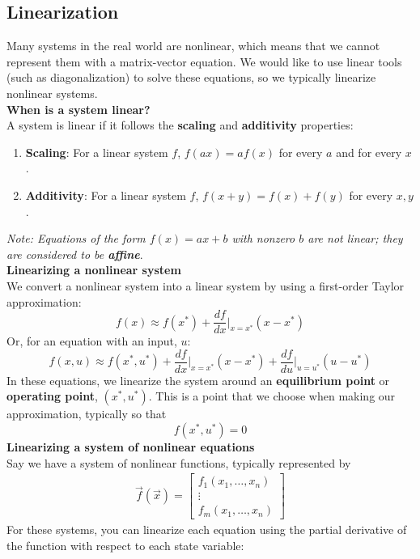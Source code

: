 \subsection*{Linearization}
Many systems in the real world are nonlinear, which means that we cannot represent them with a matrix-vector equation. 
We would like to use linear tools (such as diagonalization) to solve these equations, so we typically linearize nonlinear systems. \\
\newline
\textbf{When is a system linear?} \\
A system is linear if it follows the \textbf{scaling} and \textbf{additivity} properties:
\begin{enumerate}
    \item \textbf{Scaling}: For a linear system $f$, $f(ax) = af(x)$ for every $a$ and for every $x$.
    \item \textbf{Additivity}: For a linear system $f$, $f(x + y) = f(x) + f(y)$ for every $x, y$.
\end{enumerate}
\textit{Note: Equations of the form $f(x) = ax + b$ with nonzero $b$ are not linear; they are considered to be \textbf{affine}}. \\
\newline
\textbf{Linearizing a nonlinear system} \\
We convert a nonlinear system into a linear system by using a first-order Taylor approximation:
$$f(x) \approx f(x^*) + \frac{df}{dx} \bigg\rvert_{x = x^*} (x - x^*)$$
Or, for an equation with an input, $u$:
$$f(x, u) \approx f(x^*, u^*) + \frac{df}{dx} \bigg\rvert_{x = x^*} (x - x^*) + \frac{df}{du} \bigg\rvert_{u = u^*} (u - u^*)$$
In these equations, we linearize the system around an \textbf{equilibrium point} or \textbf{operating point}, $(x^*, u^*)$. 
This is a point that we choose when making our approximation, typically so that
$$f(x^*, u^*) = 0$$
\newline
\textbf{Linearizing a system of nonlinear equations} \\
Say we have a system of nonlinear functions, typically represented by
\begin{align*}
    \vec{f}(\vec{x}) = \begin{bmatrix}
        f_1(x_1, \dots, x_n) \\
        \vdots \\
        f_m(x_1, \dots, x_n)
    \end{bmatrix}
\end{align*}
For these systems, you can linearize each equation using the partial derivative of the function with respect to each state variable:
